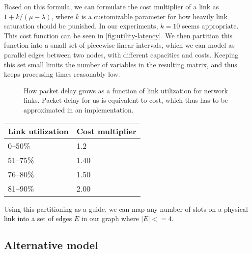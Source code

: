 
Based on this formula, we can formulate the cost multiplier of a link as $1 + k/(\mu - \lambda)$, where $k$ is a customizable parameter for how heavily link saturation should be punished. In our experiments, $k=10$ seems appropriate. This cost function can be seen in \autoref{fig:utility-latency}. We then partition this function into a small set of piecewise linear intervals, which we can model as parallel edges between two nodes, with different capacities and costs. Keeping this set small limits the number of variables in the resulting matrix, and thus keeps processing times reasonably low.

\begin{figure}
    \centering
    \caption{How packet delay grows as a function of link utilization for network links. Packet delay for us is equivalent to cost, which thus has to be approximated in an implementation.}
    \label{fig:utility-latency}
\end{figure}


\begin{center}
    \label{tab:utilization-to-cost}
    \begin{tabular}{| l | l |}
    \hline
    \textbf{Link utilization} & \textbf{Cost multiplier} \\ \hline
    0--50\% & 1.2 \\ \hline
    51--75\% & 1.40 \\ \hline
    76--80\% & 1.50 \\ \hline
    81--90\% & 2.00 \\ \hline
    \end{tabular}
\end{center}

Using this partitioning as a guide, we can map any number of slots on a physical link into a set of edges $E$ in our graph where $|E| <= 4$.




\subsection{Alternative model}\label{sec:alternative-model}

